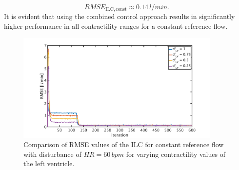 \begin{equation}
  RMSE_{\mathrm{ILC,const}}\approx0.14\,l/min.
\end{equation}
\newpage
It is evident that using the combined control approach results in significantly higher performance in all contractility ranges for a constant reference flow.
\begin{figure}[ht!]
  \centering
  \includegraphics[width=0.9\textwidth]{images/chapt_5/ILC/RMSE_dist_const_5_var_cf.pdf}
  \caption[RMSE Comparison of ILC at constant reference flow for varying left ventricular contractilities]{Comparison of RMSE values of the ILC for constant reference flow with disturbance of $HR=60\,bpm$ for varying contractility values of the left ventricle.}
  \label{fig:RMSE_dist_const_5_var_cf}
\end{figure}

